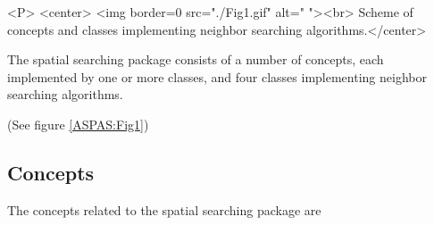 \begin{ccHtmlOnly}

<P>
<center>
<img border=0 src="./Fig1.gif" alt=" "><br> 
Scheme of concepts and classes implementing neighbor searching algorithms.</center>
\end{ccHtmlOnly}



The spatial searching package consists of a number of concepts, each implemented by
one or more classes, and four classes implementing neighbor 
searching algorithms. 
\begin{ccTexOnly}
(See figure \ref{ASPAS:Fig1}) 
\end{ccTexOnly}

\subsection{Concepts}

The concepts related to the spatial searching package are

